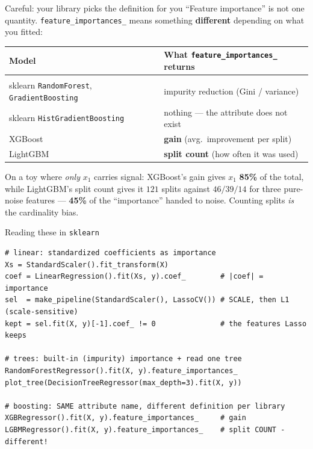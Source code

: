\documentclass[aspectratio=169]{beamer}
\begin{document}
\begin{frame}{Careful: your library picks the definition for you}
  ``Feature importance'' is not one quantity. \texttt{feature\_importances\_} means something
  \textbf{different} depending on what you fitted:
  \vskip 6pt
  \begin{center}\small
    \begin{tabular}{ll}
      \textbf{Model} & \textbf{What \texttt{feature\_importances\_} returns} \\[2pt]
      \hline \\[-6pt]
      sklearn \texttt{RandomForest}, \texttt{GradientBoosting} & impurity reduction (Gini / variance) \\
      sklearn \texttt{HistGradientBoosting} & \textcolor{armred}{nothing --- the attribute does not exist} \\
      XGBoost & \textbf{gain} (avg.\ improvement per split) \\
      LightGBM & \textbf{split count} (how often it was used) \\
    \end{tabular}
  \end{center}
  \vskip 6pt
  \footnotesize On a toy where \emph{only} $x_1$ carries signal: XGBoost's gain gives $x_1$
  \textbf{85\%} of the total, while LightGBM's split count gives it $121$ splits against
  $46/39/14$ for three pure-noise features --- \textbf{45\%} of the ``importance'' handed to noise.
  Counting splits \emph{is} the cardinality bias.
  \vskip 4pt
\end{frame}

\begin{frame}[fragile]{Reading these in \texttt{sklearn}}
\begin{lstlisting}
# linear: standardized coefficients as importance
Xs = StandardScaler().fit_transform(X)
coef = LinearRegression().fit(Xs, y).coef_        # |coef| = importance
sel  = make_pipeline(StandardScaler(), LassoCV()) # SCALE, then L1 (scale-sensitive)
kept = sel.fit(X, y)[-1].coef_ != 0               # the features Lasso keeps

# trees: built-in (impurity) importance + read one tree
RandomForestRegressor().fit(X, y).feature_importances_
plot_tree(DecisionTreeRegressor(max_depth=3).fit(X, y))

# boosting: SAME attribute name, different definition per library
XGBRegressor().fit(X, y).feature_importances_     # gain
LGBMRegressor().fit(X, y).feature_importances_    # split COUNT - different!
\end{lstlisting}
\end{frame}
\end{document}
